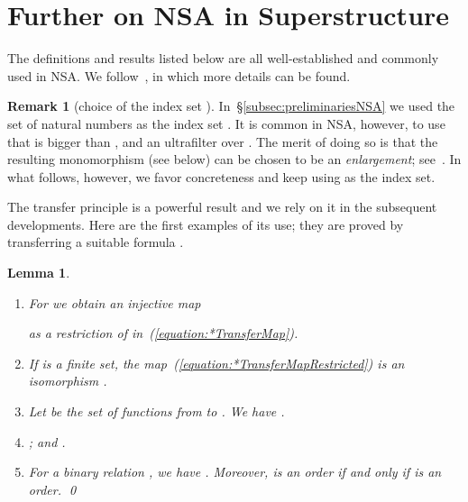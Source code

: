 \documentclass[envcountsect,orivec]{llncs} \pdfoutput=1
\newtheorem{mylem}[mythm]{Lemma}
\theoremstyle{definition}
\newtheorem{myrem}[mythm]{Remark}
\def\myqed{\qed}
\begin{document}
 

  
\newpage
\appendix
\section{Further on NSA in Superstructure}
\label{appendix:NSAPrimer}
The definitions and results  listed below are all well-established and commonly
used in NSA. We follow~\cite[Chap.~II]{Hurd1985}, in which
more details can be found.



\begin{myrem}[choice of the index set ]\label{remark:choiceOfNatAsI}
 In~\S\ref{subsec:preliminariesNSA} we used the set  of natural
 numbers as the index set . 
 It is common in NSA, however, to use  that is bigger than
 , and an ultrafilter  over . The merit of
 doing so is that the resulting monomorphism  (see below) can be
 chosen to be an \emph{enlargement}; see~\cite[Chap.~II]{Hurd1985}.
In what follows, however, we favor concreteness and keep using 
as the index set. 
\end{myrem}




The transfer principle is a powerful result and we  rely on
it in the subsequent developments. Here are the first
examples of its use; they are proved by transferring a suitable formula .


\begin{mylem}\label{lemma:firstUseOfTransfer}
\begin{enumerate}
 \item\label{item:*transformRestricted}
   For  we obtain an injective map
  
 as a restriction of  in~(\ref{equation:*TransferMap}).
 \item\label{item:starFiniteIsFinite} If   is a finite set, the 
      map~(\ref{equation:*TransferMapRestricted}) is an isomorphism
      .
 \item \label{item:functionSpaceTransformed} Let  be the
       set of functions from  to . We have
       .
 \item\label{item:productUnionTransformed}
      ; and  
      .
 \item\label{item:binaryRelTransformed} For a binary relation , we have
       . Moreover,   is
      an order if and only if  is an order. \myqed
\end{enumerate}
\end{mylem}
\end{document}

